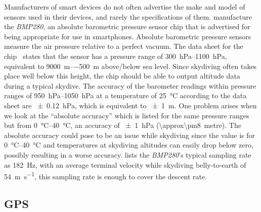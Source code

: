 \documentclass[twocolumn]{article}
\begin{document}
Manufacturers of smart devices do not often advertise the make and model of sensors used in their devices, and rarely the specifications of them. \citeauthor{bosch_bmp280:_2016} manufacture the \textit{BMP280}, an absolute barometric pressure sensor chip that is advertised for being appropriate for use in smartphones. Absolute barometric pressure sensors measure the air pressure relative to a perfect vacuum. The data sheet for the chip~\cite{bosch_bmp280:_2016} states that the sensor has a pressure range of \SIrange{300}{1100}{\hecto\pascal}, equivalent to \SIrange{+9000}{-500}{\metre} above/below sea level. Since skydiving often takes place well below this height, the chip should be able to output altitude data during a typical skydive. The accuracy of the barometer readings within pressure ranges of \SIrange{950}{1050}{\hecto\pascal} at a temperature of \SI{25}{\degreeCelsius} according to the data sheet are \SI{\pm0.12}{\hecto\pascal}, which is equivalent to \SI{\pm1}{\metre}. One problem arises when we look at the ``absolute accuracy'' which is listed for the same pressure ranges but from \SIrange{0}{40}{\degreeCelsius}, an accuracy of \SI{\pm1}{\hecto\pascal} (\SI{\approx\pm8}{metre}). The absolute accuracy could pose to be an issue while skydiving since the value is for \SIrange{0}{40}{\degreeCelsius} and temperatures at skydiving altitudes can easily drop below zero, possibly resulting in a worse accuracy. \citeauthor{bosch_bmp280:_2016} lists the \textit{BMP280}'s typical sampling rate as \SI{182}{\Hz}, with an average terminal velocity while skydiving belly-to-earth of \SI{54}{\metre\per\second}, this sampling rate is enough to cover the descent rate.








\subsection{GPS} %
\end{document}
